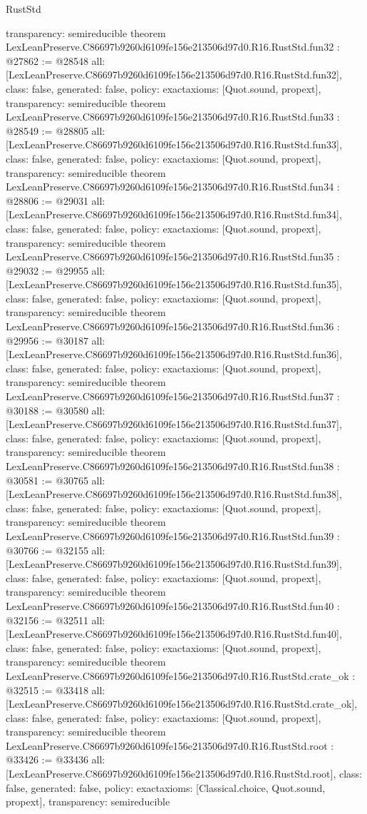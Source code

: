 \begin{lexlean}{RustStd}
\begin{coremodule}
{  transparency: semireducible
}
theorem LexLeanPreserve.C86697b9260d6109fe156e213506d97d0.R16.RustStd.fun32 : @27862 := @28548 {
  all: [LexLeanPreserve.C86697b9260d6109fe156e213506d97d0.R16.RustStd.fun32],
  class: false,
  generated: false,
  policy: exact{axioms: [Quot.sound, propext]},
  transparency: semireducible
}
theorem LexLeanPreserve.C86697b9260d6109fe156e213506d97d0.R16.RustStd.fun33 : @28549 := @28805 {
  all: [LexLeanPreserve.C86697b9260d6109fe156e213506d97d0.R16.RustStd.fun33],
  class: false,
  generated: false,
  policy: exact{axioms: [Quot.sound, propext]},
  transparency: semireducible
}
theorem LexLeanPreserve.C86697b9260d6109fe156e213506d97d0.R16.RustStd.fun34 : @28806 := @29031 {
  all: [LexLeanPreserve.C86697b9260d6109fe156e213506d97d0.R16.RustStd.fun34],
  class: false,
  generated: false,
  policy: exact{axioms: [Quot.sound, propext]},
  transparency: semireducible
}
theorem LexLeanPreserve.C86697b9260d6109fe156e213506d97d0.R16.RustStd.fun35 : @29032 := @29955 {
  all: [LexLeanPreserve.C86697b9260d6109fe156e213506d97d0.R16.RustStd.fun35],
  class: false,
  generated: false,
  policy: exact{axioms: [Quot.sound, propext]},
  transparency: semireducible
}
theorem LexLeanPreserve.C86697b9260d6109fe156e213506d97d0.R16.RustStd.fun36 : @29956 := @30187 {
  all: [LexLeanPreserve.C86697b9260d6109fe156e213506d97d0.R16.RustStd.fun36],
  class: false,
  generated: false,
  policy: exact{axioms: [Quot.sound, propext]},
  transparency: semireducible
}
theorem LexLeanPreserve.C86697b9260d6109fe156e213506d97d0.R16.RustStd.fun37 : @30188 := @30580 {
  all: [LexLeanPreserve.C86697b9260d6109fe156e213506d97d0.R16.RustStd.fun37],
  class: false,
  generated: false,
  policy: exact{axioms: [Quot.sound, propext]},
  transparency: semireducible
}
theorem LexLeanPreserve.C86697b9260d6109fe156e213506d97d0.R16.RustStd.fun38 : @30581 := @30765 {
  all: [LexLeanPreserve.C86697b9260d6109fe156e213506d97d0.R16.RustStd.fun38],
  class: false,
  generated: false,
  policy: exact{axioms: [Quot.sound, propext]},
  transparency: semireducible
}
theorem LexLeanPreserve.C86697b9260d6109fe156e213506d97d0.R16.RustStd.fun39 : @30766 := @32155 {
  all: [LexLeanPreserve.C86697b9260d6109fe156e213506d97d0.R16.RustStd.fun39],
  class: false,
  generated: false,
  policy: exact{axioms: [Quot.sound, propext]},
  transparency: semireducible
}
theorem LexLeanPreserve.C86697b9260d6109fe156e213506d97d0.R16.RustStd.fun40 : @32156 := @32511 {
  all: [LexLeanPreserve.C86697b9260d6109fe156e213506d97d0.R16.RustStd.fun40],
  class: false,
  generated: false,
  policy: exact{axioms: [Quot.sound, propext]},
  transparency: semireducible
}
theorem LexLeanPreserve.C86697b9260d6109fe156e213506d97d0.R16.RustStd.crate_ok : @32515 := @33418 {
  all: [LexLeanPreserve.C86697b9260d6109fe156e213506d97d0.R16.RustStd.crate_ok],
  class: false,
  generated: false,
  policy: exact{axioms: [Quot.sound, propext]},
  transparency: semireducible
}
theorem LexLeanPreserve.C86697b9260d6109fe156e213506d97d0.R16.RustStd.root : @33426 := @33436 {
  all: [LexLeanPreserve.C86697b9260d6109fe156e213506d97d0.R16.RustStd.root],
  class: false,
  generated: false,
  policy: exact{axioms: [Classical.choice, Quot.sound, propext]},
  transparency: semireducible
}


\end{coremodule}
\end{lexlean}
